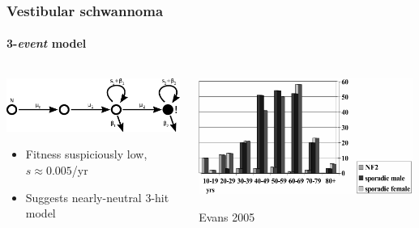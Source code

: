 \documentclass{beamer}
\begin{document}
\begin{frame}
    \frametitle{Vestibular schwannoma}
    \framesubtitle{3-\emph{event} model}

    \begin{columns}
        \begin{column}{0.5\textwidth}
        \includegraphics[width=0.99\textwidth]{figures/diagram3}

        \begin{itemize}
            \item Fitness suspiciously low, $s \approx 0.005$/yr
            \footnotemark[1]
            \item Suggests nearly-neutral 3-hit model
            \footnotemark[3]
        \end{itemize}
        \end{column}
        \begin{column}{0.5\textwidth}
        \includegraphics[width=0.99\textwidth]{figures/DGREvans2005}
        \begin{center}
            \small{Evans 2005\footnotemark[2]}
        \end{center}
        \end{column}
    \end{columns}

\end{frame}
\end{document}

